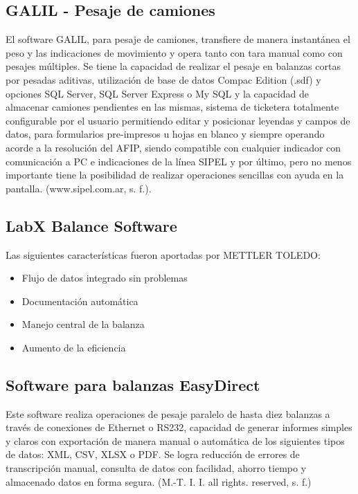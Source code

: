 \documentclass{article}
\begin{document}
        {
        
        \subsection{GALIL - Pesaje de camiones}
        {\noindent El software GALIL, para pesaje de camiones, transfiere de manera instantánea el peso y las
        indicaciones de movimiento y opera tanto con tara manual como con pesajes múltiples. Se tiene la
        capacidad de realizar el pesaje en balanzas cortas por pesadas aditivas, utilización de base de datos
        Compac Edition (.sdf) y opciones SQL Server, SQL Server Express o My SQL y la capacidad de
        almacenar camiones pendientes en las mismas, sistema de ticketera totalmente configurable por el
        usuario permitiendo editar y posicionar leyendas y campos de datos, para formularios pre-impresos
        u hojas en blanco y siempre operando acorde a la resolución del AFIP, siendo compatible con
        cualquier indicador con comunicación a PC e indicaciones de la línea SIPEL y por último, pero no
        menos importante tiene la posibilidad de realizar operaciones sencillas con ayuda en la pantalla.
        (www.sipel.com.ar, s. f.).}
        
        \subsection{LabX Balance Software}
        {\noindent Las siguientes características fueron aportadas por METTLER TOLEDO:}
        \begin{itemize}
        \item Flujo de datos integrado sin problemas
        \item Documentación automática
        \item Manejo central de la balanza
        \item Aumento de la eficiencia
        \end{itemize}
        
        \subsection{Software para balanzas EasyDirect}
        {\noindent Este software realiza operaciones de pesaje paralelo de hasta diez balanzas a través de conexiones de
        Ethernet o RS232, capacidad de generar informes simples y claros con exportación de manera manual
        o automática de los siguientes tipos de datos: XML, CSV, XLSX o PDF. Se logra reducción de errores
        de transcripción manual, consulta de datos con facilidad, ahorro tiempo y almacenado datos en forma
        segura. (M.-T. I. I. all rights. reserved, s. f.)}
        
}
\end{document}
